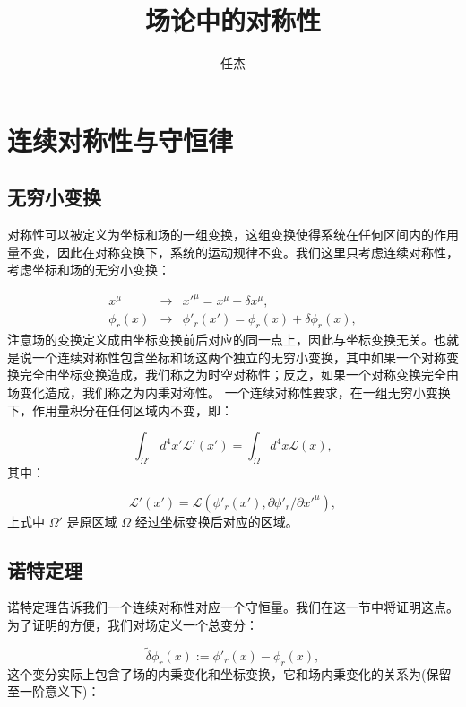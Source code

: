 \documentclass[10pt,UTF8]{ctexart}
\begin{document}
\title{场论中的对称性}
\author{任杰}
\date{}
\maketitle

\section*{连续对称性与守恒律}

\subsection*{无穷小变换}
\noindent
对称性可以被定义为坐标和场的一组变换，这组变换使得系统在任何区间内的作用量不变，因此在对称变换下，系统的运动规律不变。我们这里只考虑连续对称性，考虑坐标和场的无穷小变换： 

\begin{eqnarray}
x^{\mu} & \rightarrow & x'^{\mu}=x^{\mu}+\delta x^{\mu},\\
\phi_{r}\left(x\right) & \rightarrow & \phi'_{r}\left(x'\right)=\phi_{r}\left(x\right)+\delta\phi_{r}\left(x\right),
\end{eqnarray}
注意场的变换定义成由坐标变换前后对应的同一点上，因此与坐标变换无关。也就是说一个连续对称性包含坐标和场这两个独立的无穷小变换，其中如果一个对称变换完全由坐标变换造成，我们称之为时空对称性；反之，如果一个对称变换完全由场变化造成，我们称之为内秉对称性。
一个连续对称性要求，在一组无穷小变换下，作用量积分在任何区域内不变，即： 

\begin{equation}
\int_{\Omega'}d^{4}x'\mathcal{L}'\left(x'\right)=\int_{\Omega}d^{4}x\mathcal{L}\left(x\right),
\end{equation}
其中： 

\begin{equation}
\mathcal{L}'\left(x'\right)=\mathcal{L}\left(\phi'_{r}\left(x'\right),\partial\phi'_{r}/\partial x'^{\mu}\right),
\end{equation}
上式中 $\Omega'$ 是原区域 $\Omega$ 经过坐标变换后对应的区域。 

\subsection*{诺特定理}
\noindent
诺特定理告诉我们一个连续对称性对应一个守恒量。我们在这一节中将证明这点。为了证明的方便，我们对场定义一个总变分： 

\begin{equation}
\tilde{\delta}\phi_{r}\left(x\right):=\phi'_{r}\left(x\right)-\phi_{r}\left(x\right),
\end{equation}
这个变分实际上包含了场的内秉变化和坐标变换，它和场内秉变化的关系为(保留至一阶意义下)： 
\end{document}
